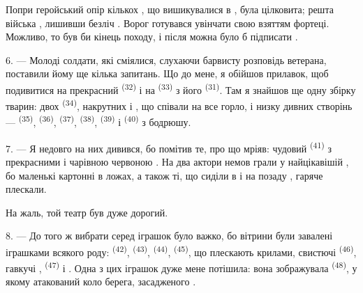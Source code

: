 Попри геройський опір кількох , що вишикувалися в
,  була цілковита; решта війська ,
лишивши безліч . Ворог готувався увінчати свою
 взяттям фортеці. Можливо, то був би кінець походу, і після
 можна було б підписати .

\VUsaut{4.4mm}
\VUsaut{2.8mm}

6. --- Молоді солдати, які сміялися, слухаючи барвисту розповідь ветерана,
поставили йому ще кілька запитань. Що до мене, я обійшов прилавок, щоб
подивитися на прекрасний  \textsuperscript{(32)} і на
 \textsuperscript{(33)} з його 
\textsuperscript{(31)}. Там я знайшов ще одну збірку тварин: двох  \textsuperscript{(34)}, накрутних  і
, що співали на все горло, і низку дивних створінь ---
 \textsuperscript{(35)},  \textsuperscript{(36)},
 \textsuperscript{(37)},  \textsuperscript{(38)},
 \textsuperscript{(39)} і  \textsuperscript{(40)} з
бодрюшу.

7. --- Я недовго на них дивився, бо помітив те, про що мріяв: чудовий
 \textsuperscript{(41)} з прекрасними
 і чарівною червоною . На  два
актори немов грали  у найцікавішій , бо маленькі
картонні  в ложах, а також ті, що сиділи в  і на
 позаду , гаряче плескали.

На жаль, той театр був дуже дорогий.

8. --- До того ж вибрати серед іграшок було важко, бо вітрини були завалені
іграшками всякого роду:  \textsuperscript{(42)},
 \textsuperscript{(43)},  \textsuperscript{(44)},
 \textsuperscript{(45)}, що плескають крилами, свистючі
 \textsuperscript{(46)}, гавкучі ,
 \textsuperscript{(47)} і . Одна з цих
іграшок дуже мене потішила: вона зображувала 
\textsuperscript{(48)}, у якому  атакований 
коло берега, засадженого .


